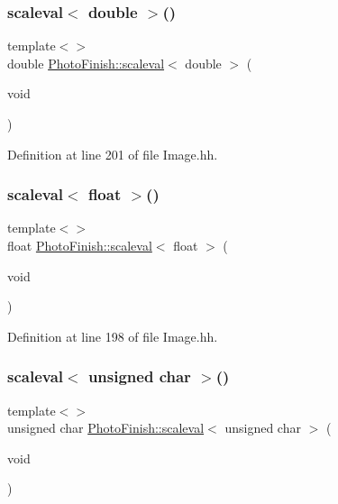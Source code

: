 \subsubsection{\texorpdfstring{scaleval$<$ double $>$()}{scaleval< double >()}}
{\footnotesize\ttfamily template$<$$>$ \\
double \hyperlink{namespace_photo_finish_a1bfb8180736f3b2786f47361d7586f2c}{Photo\+Finish\+::scaleval}$<$ double $>$ (\begin{DoxyParamCaption}\item[{void}]{ }\end{DoxyParamCaption})\hspace{0.3cm}{\ttfamily [inline]}}



Definition at line 201 of file Image.\+hh.

\mbox{\label{namespace_photo_finish_a5a36600ec83f00881b849f7fb26666dc}} 
\subsubsection{\texorpdfstring{scaleval$<$ float $>$()}{scaleval< float >()}}
{\footnotesize\ttfamily template$<$$>$ \\
float \hyperlink{namespace_photo_finish_a1bfb8180736f3b2786f47361d7586f2c}{Photo\+Finish\+::scaleval}$<$ float $>$ (\begin{DoxyParamCaption}\item[{void}]{ }\end{DoxyParamCaption})\hspace{0.3cm}{\ttfamily [inline]}}



Definition at line 198 of file Image.\+hh.

\mbox{\label{namespace_photo_finish_a653d84177058782ef68b4c5f5c0c5acc}} 
\subsubsection{\texorpdfstring{scaleval$<$ unsigned char $>$()}{scaleval< unsigned char >()}}
{\footnotesize\ttfamily template$<$$>$ \\
unsigned char \hyperlink{namespace_photo_finish_a1bfb8180736f3b2786f47361d7586f2c}{Photo\+Finish\+::scaleval}$<$ unsigned char $>$ (\begin{DoxyParamCaption}\item[{void}]{ }\end{DoxyParamCaption})\hspace{0.3cm}{\ttfamily [inline]}}



